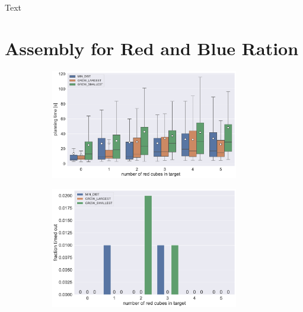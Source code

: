 Text


\section{Assembly for Red and Blue Ration}
\label{sec:AFNR}

\begin{figure}
	\centering
	\begin{subfigure}[b]{\textwidth}
		\centering
		\includegraphics[width=0.9\textwidth]{figures/plots/AFNR_time.pdf}
		\caption{}
		\label{fig:AFNR_time}
	\end{subfigure}
	
	\begin{subfigure}[b]{\textwidth}
		\centering
		\includegraphics[width=0.9\textwidth]{figures/plots/AFNR_timeout.pdf}
		\caption{}
		\label{fig:AFNR_timeout}
	\end{subfigure}
	\caption[]{}
	\label{fig:AFNR_timestats}
\end{figure}

